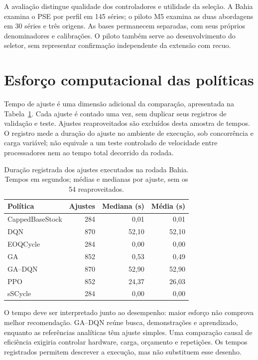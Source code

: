 
A avaliação distingue qualidade dos controladores e utilidade da seleção. A Bahia examina o PSE por perfil em 145 séries; o piloto M5 examina as duas abordagens em 30 séries e três origens. As bases permanecem separadas, com seus próprios denominadores e calibrações. O piloto também serve ao desenvolvimento do seletor, sem representar confirmação independente da extensão com recuo.




\section{Esforço computacional das políticas}

\label{sec:computational_results}

Tempo de ajuste é uma dimensão adicional da comparação, apresentada na Tabela~\ref{tab:fit_time}. Cada ajuste é contado uma vez, sem duplicar seus registros de validação e teste. Ajustes reaproveitados são excluídos desta amostra de tempos. O registro mede a duração do ajuste no ambiente de execução, sob concorrência e carga variável; não equivale a um teste controlado de velocidade entre processadores nem ao tempo total decorrido da rodada.

\begin{table}[htbp]\centering\small
\caption{Duração registrada dos ajustes executados na rodada Bahia. Tempos em segundos; médias e medianas por ajuste, sem os 54 reaproveitados.}
\label{tab:fit_time}
\begin{tabular}{@{}lrrr@{}}\toprule
Política & Ajustes & Mediana (s) & Média (s)\\\midrule
CappedBaseStock & 284 & 0,01 & 0,01\\
DQN & 870 & 52,10 & 52,10\\
EOQCycle & 284 & 0,00 & 0,00\\
GA & 852 & 0,53 & 0,49\\
GA--DQN & 870 & 52,90 & 52,90\\
PPO & 852 & 24,37 & 26,03\\
sSCycle & 284 & 0,00 & 0,00\\
\bottomrule\end{tabular}\end{table}

O tempo deve ser interpretado junto ao desempenho: maior esforço não comprova melhor recomendação. GA--DQN reúne busca, demonstrações e aprendizado, enquanto as referências analíticas têm ajuste simples. Uma comparação causal de eficiência exigiria controlar hardware, carga, orçamento e repetições. Os tempos registrados permitem descrever a execução, mas não substituem esse desenho.


